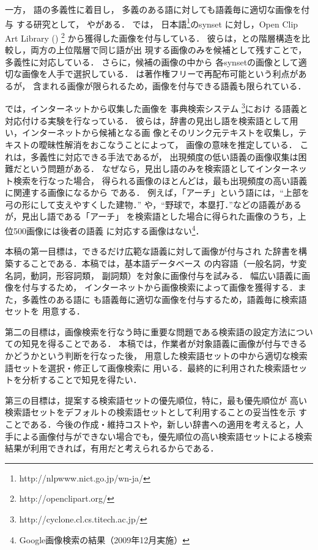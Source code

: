 \documentclass[japanese]{jnlp_1.4}
\newcommand{\lxd}{}
\newcommand{\WN}{}
\newcommand{\CL}{}
\newcommand{\OCAL}{}
\begin{document}
一方，
語の多義性に着目し，
多義のある語に対しても語義毎に適切な画像を付与
する研究として，\cite{Bond:Isahara:Fujita:Uchimoto:Kuribayashi:Kanzaki:2009} 
や\cite{Fujii:Ishikawa:2005a}がある．
\cite{Bond:Isahara:Fujita:Uchimoto:Kuribayashi:Kanzaki:2009} では，
日本語\WN\footnote{http://nlpwww.nict.go.jp/wn-ja/}のsynset
に対し，Open Clip Art Library (\OCAL)
\footnote{http://openclipart.org/} 
から獲得した画像を付与している．
彼らは，\OCAL{}と\WN{}の階層構造を比較し，両方の上位階層で同じ語が出
現する画像のみを候補として残すことで，多義性に対応している．
さらに，候補の画像の中から
各synsetの画像として適切な画像を人手で選択している．
\OCAL{} は著作権フリーで再配布可能という利点があるが，
含まれる画像が限られるため，画像を付与できる語義も限られている．


\cite{Fujii:Ishikawa:2005a} では，インターネットから収集した画像を
事典検索システム \CL\footnote{http://cyclone.cl.cs.titech.ac.jp/}におけ
る語義と対応付ける実験を行なっている．
彼らは，辞書の見出し語を検索語として用い，インターネットから候補となる画
像とそのリンク元テキストを収集し，テキストの曖昧性解消をおこなうことによって，
画像の意味を推定している．
これは，多義性に対応できる手法であるが，
出現頻度の低い語義の画像収集は困難だという問題がある．
なぜなら，見出し語のみを検索語としてインターネット検索を行なった場合，
得られる画像のほとんどは，最も出現頻度の高い語義に関連する画像になるから
である．
例えば，「アーチ」という語には，“上部を弓の形にして支えやすくした建物．”
や，“野球で，本塁打．”などの語義があるが，見出し語である「アーチ」
を検索語とした場合に得られた画像のうち，上位500画像には後者の語義
に対応する画像はない\footnote{Google画像検索の結果（2009年12月実施）
}．


本稿の第一目標は，できるだけ広範な語義に対して画像が付与され
た辞書を構築することである．本稿では，基本語データベース\lxd{}
\cite{Amano:Kobayashi:2008j}の内容語（一般名詞，サ変名詞，動詞，形容詞類，
副詞類）を対象に画像付与を試みる．
幅広い語義に画像を付与するため，
インターネットから画像検索によって画像を獲得する．また，多義性のある語に
も語義毎に適切な画像を付与するため，語義毎に検索語セットを
用意する．

第二の目標は，画像検索を行なう時に重要な問題である検索語の設定方法につい
ての知見を得ることである．
本稿では，作業者が対象語義に画像が付与できるかどうかという判断を行なった後，
用意した検索語セットの中から適切な検索語セットを選択・修正して画像検索に
用いる．最終的に利用された検索語セットを分析することで知見を得たい．

第三の目標は，提案する検索語セットの優先順位，特に，最も優先順位が
高い検索語セットをデフォルトの検索語セットとして利用することの妥当性を示
すことである．今後の作成・維持コストや，新しい辞書への適用を考えると，人
手による画像付与ができない場合でも，優先順位の高い検索語セットによる検索
結果が利用できれば，有用だと考えられるからである．
\end{document}
